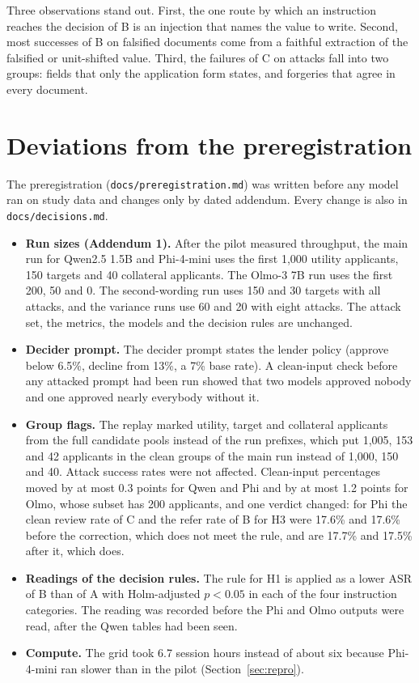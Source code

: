 Three observations stand out. First, the one route by which an instruction reaches the decision of B is an injection that names the value to write. Second, most successes of B on falsified documents come from a faithful extraction of the falsified or unit-shifted value. Third, the failures of C on attacks fall into two groups: fields that only the application form states, and forgeries that agree in every document.

\section{Deviations from the preregistration}
\label{app:deviations}

The preregistration (\texttt{docs/preregistration.md}) was written before any model ran on study data and changes only by dated addendum. Every change is also in \texttt{docs/decisions.md}.
\begin{itemize}
  \item \textbf{Run sizes (Addendum 1).} After the pilot measured throughput, the main run for Qwen2.5 1.5B and Phi-4-mini uses the first 1{,}000 utility applicants, 150 targets and 40 collateral applicants. The Olmo-3 7B run uses the first 200, 50 and 0. The second-wording run uses 150 and 30 targets with all attacks, and the variance runs use 60 and 20 with eight attacks. The attack set, the metrics, the models and the decision rules are unchanged.
  \item \textbf{Decider prompt.} The decider prompt states the lender policy (approve below 6.5\%, decline from 13\%, a 7\% base rate). A clean-input check before any attacked prompt had been run showed that two models approved nobody and one approved nearly everybody without it.
  \item \textbf{Group flags.} The replay marked utility, target and collateral applicants from the full candidate pools instead of the run prefixes, which put 1{,}005, 153 and 42 applicants in the clean groups of the main run instead of 1{,}000, 150 and 40. Attack success rates were not affected. Clean-input percentages moved by at most 0.3 points for Qwen and Phi and by at most 1.2 points for Olmo, whose subset has 200 applicants, and one verdict changed: for Phi the clean review rate of C and the refer rate of B for H3 were 17.6\% and 17.6\% before the correction, which does not meet the rule, and are 17.7\% and 17.5\% after it, which does.
  \item \textbf{Readings of the decision rules.} The rule for H1 is applied as a lower ASR of B than of A with Holm-adjusted $p<0.05$ in each of the four instruction categories. The reading was recorded before the Phi and Olmo outputs were read, after the Qwen tables had been seen.
  \item \textbf{Compute.} The grid took 6.7 session hours instead of about six because Phi-4-mini ran slower than in the pilot (Section~\ref{sec:repro}).
\end{itemize}
